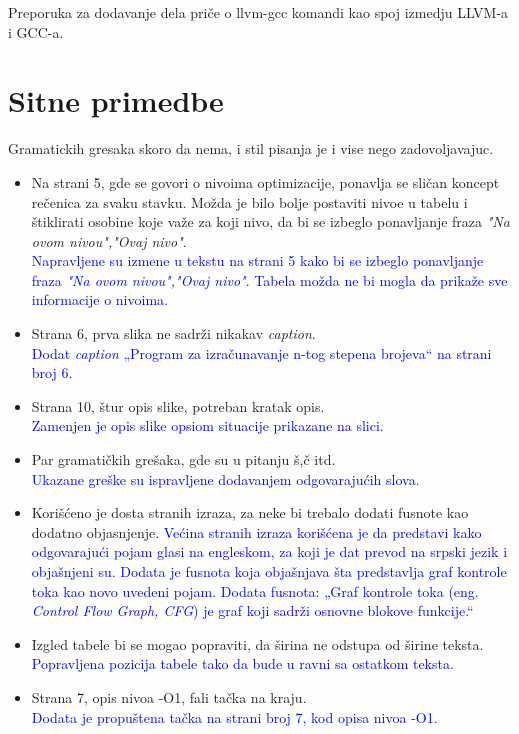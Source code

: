 \documentclass[a4paper]{report}
\newcommand{\odgovor}[1]{\textcolor{blue}{#1}}
\begin{document}
Preporuka za dodavanje dela priče o llvm-gcc komandi kao spoj izmedju LLVM-a i GCC-a.


\section{Sitne primedbe}
Gramatickih gresaka skoro da nema, i stil pisanja je i vise nego zadovoljavajuc.

\begin{itemize}
    \item Na strani 5, gde se govori o nivoima optimizacije, ponavlja se sličan koncept rečenica za svaku stavku. Možda je bilo bolje postaviti nivoe u tabelu i štiklirati osobine koje važe za koji nivo, da bi se izbeglo ponavljanje fraza \textit{"Na ovom nivou","Ovaj nivo"}. \\
          \odgovor{Napravljene su izmene u tekstu na strani 5 kako bi se izbeglo ponavljanje fraza \textit{"Na ovom nivou","Ovaj nivo"}. Tabela možda ne bi mogla da prikaže sve informacije o nivoima.}
    \item Strana 6, prva slika ne sadrži nikakav \textit{caption}. \\
         \odgovor{Dodat \textit{caption} „Program za izračunavanje n-tog stepena brojeva“ na strani broj 6.}
    \item Strana 10, štur opis slike, potreban kratak opis. \\
          \odgovor{ Zamenjen je opis slike opsiom situacije prikazane na slici. } 
    \item Par gramatičkih grešaka, gde su u pitanju š,č itd. \\
         \odgovor{Ukazane greške su ispravljene dodavanjem odgovarajućih slova.}
    \item Korišćeno je dosta stranih izraza, za neke bi trebalo dodati fusnote kao dodatno objasnjenje.
          \odgovor{Većina stranih izraza korišćena je da predstavi kako odgovarajući pojam glasi na engleskom, za koji je dat prevod na srpski jezik i objašnjeni su.
                   Dodata je fusnota koja objašnjava šta predstavlja graf kontrole toka kao novo uvedeni pojam.
                   Dodata fusnota: „Graf kontrole toka (eng. ~ {\em Control Flow Graph, CFG}) je graf koji sadrži osnovne blokove funkcije.“
          }
    \item Izgled tabele bi se mogao popraviti, da širina ne odstupa od širine teksta. \\
    \odgovor{ Popravljena pozicija tabele tako da bude u ravni sa ostatkom teksta.} 
    \item Strana 7, opis nivoa -O1, fali tačka na kraju. \\
         \odgovor{Dodata je propuštena tačka na strani broj 7, kod opisa nivoa -O1.}
    
\end{itemize}
\end{document}
